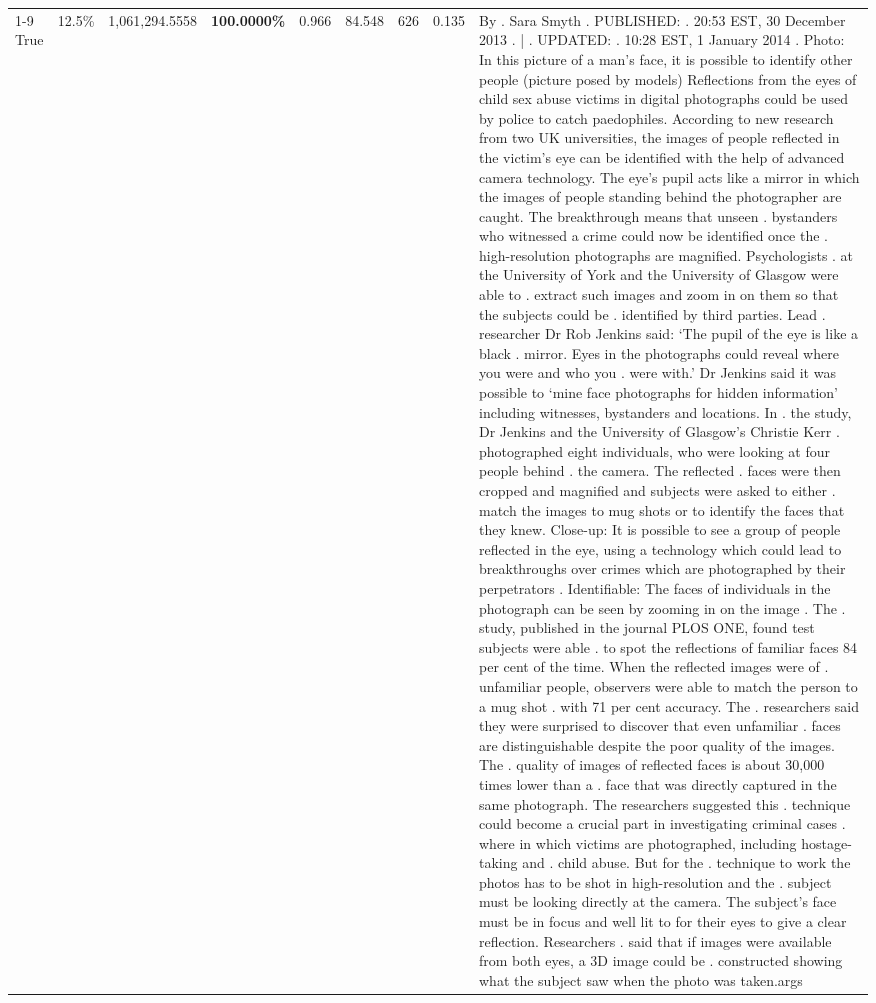 \begin{table}[H]
\begin{tabular}{lllrlllll}
\cline{1-9} \cline{2-9}
True & 12.5\% & 1,061,294.5558 & \bfseries \color{red} 100.0000\% & 0.966 & 84.548 & 626 & 0.135 & By . Sara Smyth . PUBLISHED: . 20:53 EST, 30 December 2013 . | . UPDATED: . 10:28 EST, 1 January 2014 . Photo: In this picture of a man's face, it is possible to identify other people (picture posed by models) Reflections from the eyes of child sex abuse victims in digital photographs could be used by police to catch paedophiles. According to new research from two UK universities, the images of people reflected in the victim's eye can be identified with the help of advanced camera technology. The eye's pupil acts like a mirror in which the images of people standing behind the photographer are caught. The breakthrough means that unseen . bystanders who witnessed a crime could now be identified once the . high-resolution photographs are magnified. Psychologists . at the University of York and the University of Glasgow were able to . extract such images and zoom in on them so that the subjects could be . identified by third parties. Lead . researcher Dr Rob Jenkins said: ‘The pupil of the eye is like a black . mirror. Eyes in the photographs could reveal where you were and who you . were with.' Dr Jenkins said it was possible to ‘mine face photographs for hidden information' including witnesses, bystanders and locations. In . the study, Dr Jenkins and the University of Glasgow's Christie Kerr . photographed eight individuals, who were looking at four people behind . the camera. The reflected . faces were then cropped and magnified and subjects were asked to either . match the images to mug shots or to identify the faces that they knew. Close-up: It is possible to see a group of people reflected in the eye, using a technology which could lead to breakthroughs over crimes which are photographed by their perpetrators . Identifiable: The faces of individuals in the photograph can be seen by zooming in on the image . The . study, published in the journal PLOS ONE, found test subjects were able . to spot the reflections of familiar faces 84 per cent of the time. When the reflected images were of . unfamiliar people, observers were able to match the person to a mug shot . with 71 per cent accuracy. The . researchers said they were surprised to discover that even unfamiliar . faces are distinguishable despite the poor quality of the images. The . quality of images of reflected faces is about 30,000 times lower than a . face that was directly captured in the same photograph. The researchers suggested this . technique could become a crucial part in investigating criminal cases . where in which victims are photographed, including hostage-taking and . child abuse. But for the . technique to work the photos has to be shot in high-resolution and the . subject must be looking directly at the camera. The subject's face must be in focus and well lit to for their eyes to give a clear reflection. Researchers . said that if images were available from both eyes, a 3D image could be . constructed showing what the subject saw when the photo was taken.args \\

\end{tabular}
\end{table}
